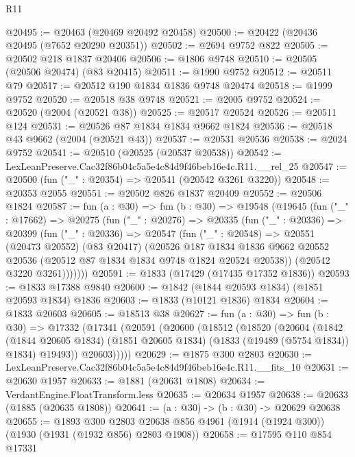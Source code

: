 \begin{lexlean}{R11}
\begin{coremodule}
@20495 := @20463 (@20469 @20492 @20458)
@20500 := @20422 (@20436 @20495 (@7652 @20290 @20351))
@20502 := @2694 @9752 @822
@20505 := @20502 @218 @1837 @20406
@20506 := @1806 @9748
@20510 := @20505 (@20506 @20474) (@83 @20415)
@20511 := @1990 @9752
@20512 := @20511 @79
@20517 := @20512 @190 @1834 @1836 @9748 @20474
@20518 := @1999 @9752
@20520 := @20518 @38 @9748
@20521 := @2005 @9752
@20524 := @20520 (@2004 (@20521 @38))
@20525 := @20517 @20524
@20526 := @20511 @124
@20531 := @20526 @87 @1834 @1834 @9662 @1824
@20536 := @20518 @43 @9662 (@2004 (@20521 @43))
@20537 := @20531 @20536
@20538 := @2024 @9752
@20541 := @20510 (@20525 (@20537 @20538))
@20542 := LexLeanPreserve.Cac32f86b04c5a5e4c84d9f46beb16e4c.R11.__rel_25
@20547 := @20500 (fun ("_" : @20354) => @20541 (@20542 @3261 @3220))
@20548 := @20353 @2055
@20551 := @20502 @826 @1837 @20409
@20552 := @20506 @1824
@20587 := fun (a : @30) =>
  fun (b : @30) =>
  @19548
    (@19645
      (fun ("_" : @17662) =>
      @20275
        (fun ("_" : @20276) =>
        @20335
          (fun ("_" : @20336) =>
          @20399
            (fun ("_" : @20336) =>
            @20547
              (fun ("_" : @20548) =>
              @20551
                (@20473 @20552)
                (@83 @20417)
                (@20526
                  @187
                  @1834
                  @1836
                  @9662
                  @20552
                  @20536
                  (@20512 @87 @1834 @1834 @9748 @1824 @20524 @20538))
                (@20542 @3220 @3261)))))))
@20591 := @1833 (@17429 (@17435 @17352 @1836))
@20593 := @1833 @17388 @9840
@20600 := @1842 (@1844 @20593 @1834) (@1851 @20593 @1834) @1836
@20603 := @1833 (@10121 @1836) @1834
@20604 := @1833 @20603
@20605 := @18513 @38
@20627 := fun (a : @30) =>
  fun (b : @30) =>
  @17332
    (@17341
      (@20591
        (@20600
          (@18512
            (@18520
              (@20604
                (@1842
                  (@1844 @20605 @1834)
                  (@1851 @20605 @1834)
                  (@1833 (@19489 (@5754 @1834)) @1834)
                  @19493))
              @20603)))))
@20629 := @1875 @300 @2803
@20630 := LexLeanPreserve.Cac32f86b04c5a5e4c84d9f46beb16e4c.R11.__fits_10
@20631 := @20630 @1957
@20633 := @1881 (@20631 @1808)
@20634 := VerdantEngine.FloatTransform.less
@20635 := @20634 @1957
@20638 := @20633 (@1885 (@20635 @1808))
@20641 := (a : @30) -> (b : @30) -> @20629 @20638
@20655 := @1893
    @300
    @2803
    @20638
    @856
    @4961
    (@1914 (@1924 @300))
    (@1930 (@1931 (@1932 @856) @2803 @1908))
@20658 := @17595 @110 @854 @17331

\end{coremodule}
\end{lexlean}
